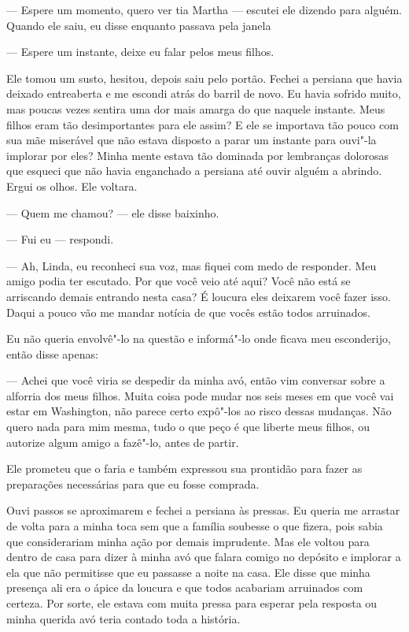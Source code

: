 --- Espere um momento, quero ver tia Martha --- escutei ele dizendo para
alguém. Quando ele saiu, eu disse enquanto passava pela janela

--- Espere um instante, deixe eu falar pelos meus filhos.

Ele tomou um susto, hesitou, depois saiu pelo portão. Fechei a persiana
que havia deixado entreaberta e me escondi atrás do barril de novo. Eu
havia sofrido muito, mas poucas vezes sentira uma dor mais amarga do que
naquele instante. Meus filhos eram tão desimportantes para ele assim? E
ele se importava tão pouco com sua mãe miserável que não estava disposto
a parar um instante para ouvi"-la implorar por eles? Minha mente estava
tão dominada por lembranças dolorosas que esqueci que não havia
enganchado a persiana até ouvir alguém a abrindo. Ergui os olhos. Ele
voltara.

--- Quem me chamou? --- ele disse baixinho.

--- Fui eu --- respondi.

--- Ah, Linda, eu reconheci sua voz, mas fiquei com medo de responder.
Meu amigo podia ter escutado. Por que você veio até aqui? Você não está
se arriscando demais entrando nesta casa? É loucura eles deixarem você
fazer isso. Daqui a pouco vão me mandar notícia de que vocês estão todos
arruinados.

Eu não queria envolvê"-lo na questão e informá"-lo onde ficava meu
esconderijo, então disse apenas:

--- Achei que você viria se despedir da minha avó, então vim conversar
sobre a alforria dos meus filhos. Muita coisa pode mudar nos seis meses
em que você vai estar em Washington, não parece certo expô"-los ao risco
dessas mudanças. Não quero nada para mim mesma, tudo o que peço é que
liberte meus filhos, ou autorize algum amigo a fazê"-lo, antes de partir.

Ele prometeu que o faria e também
expressou sua prontidão para fazer as preparações necessárias para que
eu fosse comprada.

Ouvi passos se aproximarem e fechei a
persiana às pressas. Eu queria me arrastar de volta para a minha toca
sem que a família soubesse o que fizera, pois sabia que considerariam
minha ação por demais imprudente. Mas ele voltou para dentro de casa
para dizer à minha avó que falara comigo no depósito e implorar a ela
que não permitisse que eu passasse a noite na casa. Ele disse que minha
presença ali era o ápice da loucura e que todos acabariam arruinados com
certeza. Por sorte, ele estava com muita pressa para esperar pela
resposta ou minha querida avó teria contado toda a história.

